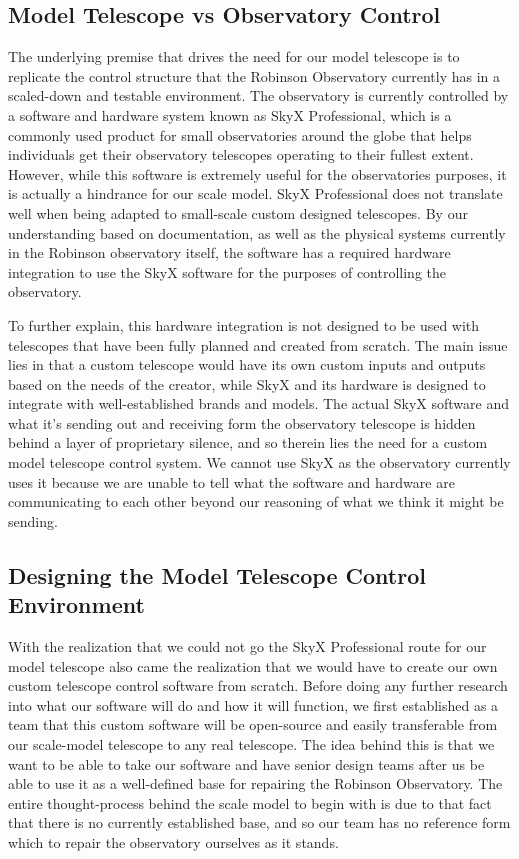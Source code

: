 \documentclass[12pt]{report}
\begin{document}
\subsection*{Model Telescope vs Observatory Control}

The underlying premise that drives the need for our model telescope is to replicate the control structure that the Robinson Observatory currently has in a scaled-down and testable environment. The observatory is currently controlled by a software and hardware system known as SkyX Professional, which is a commonly used product for small observatories around the globe that helps individuals get their observatory telescopes operating to their fullest extent. However, while this software is extremely useful for the observatories purposes, it is actually a hindrance for our scale model. SkyX Professional does not translate well when being adapted to small-scale custom designed telescopes. By our understanding based on documentation, as well as the physical systems currently in the Robinson observatory itself, the software has a required hardware integration to use the SkyX software for the purposes of controlling the observatory. 

To further explain, this hardware integration is not designed to be used with telescopes that have been fully planned and created from scratch. The main issue lies in that a custom telescope would have its own custom inputs and outputs based on the needs of the creator, while SkyX and its hardware is designed to integrate with well-established brands and models. The actual SkyX software and what it’s sending out and receiving form the observatory telescope is hidden behind a layer of proprietary silence, and so therein lies the need for a custom model telescope control system. We cannot use SkyX as the observatory currently uses it because we are unable to tell what the software and hardware are communicating to each other beyond our reasoning of what we think it might be sending. 

\subsection*{Designing the Model Telescope Control Environment}

With the realization that we could not go the SkyX Professional route for our model telescope also came the realization that we would have to create our own custom telescope control software from scratch. Before doing any further research into what our software will do and how it will function, we first established as a team that this custom software will be open-source and easily transferable from our scale-model telescope to any real telescope. The idea behind this is that we want to be able to take our software and have senior design teams after us be able to use it as a well-defined base for repairing the Robinson Observatory. The entire thought-process behind the scale model to begin with is due to that fact that there is no currently established base, and so our team has no reference form which to repair the observatory ourselves as it stands. 
\end{document}
